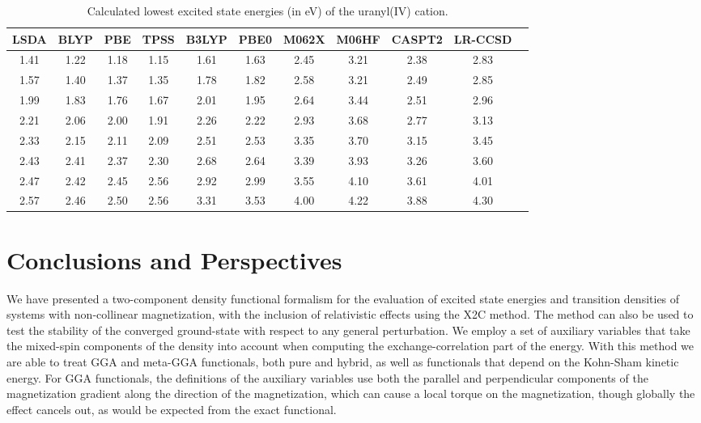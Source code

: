 \documentclass[12pt]{article}
\begin{document}
\begin{table}[htbp]
 \centering
 \caption{Calculated lowest excited state energies (in eV) of the uranyl(IV) cation.}
 \begin{tabular}{ccccccccccc}
  \hline
  LSDA   & BLYP   & PBE   & TPSS   & B3LYP   & PBE0    & M062X   & M06HF      & CASPT2\cite{vanBesien05_204309} & LR-CCSD\cite{Wahlgren07_214302} \\ \hline
  1.41   & 1.22   & 1.18  & 1.15   & 1.61    & 1.63    & 2.45    & 3.21       & 2.38   & 2.83    \\
  1.57   & 1.40   & 1.37  & 1.35   & 1.78    & 1.82    & 2.58    & 3.21       & 2.49   & 2.85    \\
  1.99   & 1.83   & 1.76  & 1.67   & 2.01    & 1.95    & 2.64    & 3.44       & 2.51   & 2.96    \\
  2.21   & 2.06   & 2.00  & 1.91   & 2.26    & 2.22    & 2.93    & 3.68       & 2.77   & 3.13    \\
  2.33   & 2.15   & 2.11  & 2.09   & 2.51    & 2.53    & 3.35    & 3.70       & 3.15   & 3.45    \\
  2.43   & 2.41   & 2.37  & 2.30   & 2.68    & 2.64    & 3.39    & 3.93       & 3.26   & 3.60    \\
  2.47   & 2.42   & 2.45  & 2.56   & 2.92    & 2.99    & 3.55    & 4.10       & 3.61   & 4.01    \\
  2.57   & 2.46   & 2.50  & 2.56   & 3.31    & 3.53    & 4.00    & 4.22       & 3.88   & 4.30    \\
  \hline
 \end{tabular}
 \label{tab:uo2}
\end{table}


\section{Conclusions and Perspectives}
We have presented a two-component density functional formalism for the evaluation of excited state energies and transition densities of systems with non-collinear magnetization, with the inclusion of relativistic effects using the X2C method.
The method can also be used to test the stability of the converged ground-state with respect to any general perturbation.
We employ a set of auxiliary variables that take the mixed-spin components of the density into account when computing the exchange-correlation part of the energy.
With this method we are able to treat GGA and meta-GGA functionals, both pure and hybrid, as well as functionals that depend on the Kohn-Sham kinetic energy.
For GGA functionals, the definitions of the auxiliary variables use both the parallel and perpendicular components of the magnetization gradient along the direction of the magnetization, which can cause a local torque on the magnetization, though globally the effect cancels out, as would be expected from the exact functional.
\end{document}
